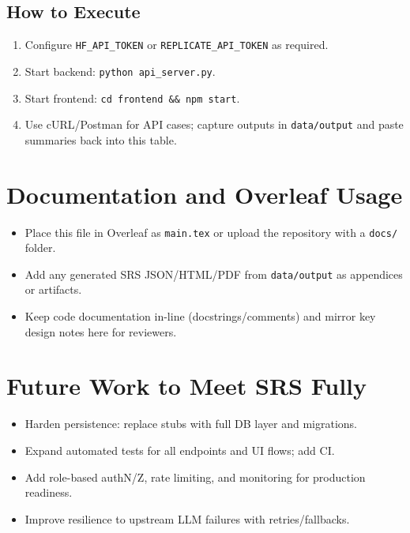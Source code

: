 \documentclass[11pt]{article}
\begin{document}
\subsection{How to Execute}
\begin{enumerate}
  \item Configure \texttt{HF\_API\_TOKEN} or \texttt{REPLICATE\_API\_TOKEN} as required.
  \item Start backend: \texttt{python api\_server.py}.
  \item Start frontend: \texttt{cd frontend \&\& npm start}.
  \item Use cURL/Postman for API cases; capture outputs in \texttt{data/output} and paste summaries back into this table.
\end{enumerate}

\section{Documentation and Overleaf Usage}
\begin{itemize}
  \item Place this file in Overleaf as \texttt{main.tex} or upload the repository with a \texttt{docs/} folder.
  \item Add any generated SRS JSON/HTML/PDF from \texttt{data/output} as appendices or artifacts.
  \item Keep code documentation in-line (docstrings/comments) and mirror key design notes here for reviewers.
\end{itemize}

\section{Future Work to Meet SRS Fully}
\begin{itemize}
  \item Harden persistence: replace stubs with full DB layer and migrations.
  \item Expand automated tests for all endpoints and UI flows; add CI.
  \item Add role-based authN/Z, rate limiting, and monitoring for production readiness.
  \item Improve resilience to upstream LLM failures with retries/fallbacks.
\end{itemize}
\end{document}
